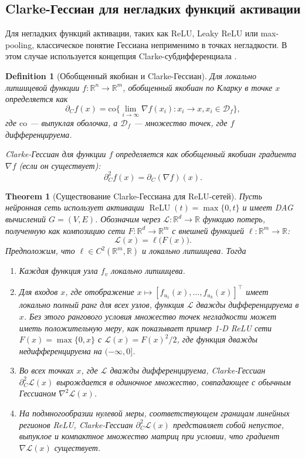 \documentclass[11pt]{article}
\newtheorem{theorem}{Theorem}
\newtheorem{definition}{Definition}
\begin{document}
\subsection{Clarke-Гессиан для негладких функций активации}

Для негладких функций активации, таких как ReLU, Leaky ReLU или max-pooling, классическое понятие Гессиана
неприменимо в точках негладкости. В этом случае используется концепция Clarke-субдифференциала
\citep{clarke1990optimization}.

\begin{definition}[Обобщенный якобиан и Clarke-Гессиан]
  Для локально липшицевой функции $f: \mathbb{R}^n \to \mathbb{R}^m$, обобщенный якобиан по Кларку в точке
  $x$ определяется как
  \[
    \partial_C f(x) = \mathrm{co}\{\lim_{i\to\infty} \nabla f(x_i) : x_i \to x, x_i \in \mathcal{D}_f\},
  \]
  где $\mathrm{co}$ — выпуклая оболочка, а $\mathcal{D}_f$ — множество точек, где $f$ дифференцируема.

  Clarke-Гессиан для функции $f$ определяется как обобщенный якобиан градиента $\nabla f$ (если он существует):
  \[
    \partial_C^2 f(x) = \partial_C(\nabla f)(x).
  \]
\end{definition}

\begin{theorem}[Существование Clarke-Гессиана для ReLU-сетей]
  \label{thm:clarke_hessian_relu}
  Пусть нейронная сеть использует активации $\operatorname{ReLU}(t)=\max\{0,t\}$
  и имеет DAG вычислений $G=(V,E)$.
  Обозначим через $\mathcal L:\mathbb R^{d}\to\mathbb R$ функцию потерь,
  полученную как композицию сети $F:\mathbb R^{d}\to\mathbb R^{m}$ с вне­шней
  функцией $\ell:\mathbb R^{m}\to\mathbb R$:
  \[
    \mathcal L(x)=\ell\bigl(F(x)\bigr).
  \]
  Предположим, что $\ell \in C^2(\mathbb{R}^m, \mathbb{R})$ и локально липшицева. Тогда

  \begin{enumerate}
    \item Каждая функция узла $f_v$ локально липшицева.
    \item Для входов $x$, где отображение $x \mapsto [f_{u_1}(x),\dots,f_{u_k}(x)]^{\!\top}$ имеет локально
      полный ранг для всех узлов, функция $\mathcal L$ дважды дифференцируема в $x$. Без этого рангового
      условия множество точек негладкости может иметь положительную меру, как показывает пример
      1-D ReLU сети $F(x)=\max\{0,x\}$ с $\mathcal L(x)=F(x)^2/2$, где функция дважды недифференцируема
      на $(-\infty,0]$.
    \item Во всех точках $x$, где $\mathcal L$ дважды дифференцируема,
      Clarke-Гессиан $\partial^2_C\mathcal L(x)$ вырождается в одиночное множество,
      совпадающее с обычным Гессианом $\nabla^{2}\mathcal L(x)$.
    \item На подмногообразии нулевой меры, соответствующем границам линейных регионов ReLU,
      Clarke-Гессиан $\partial^2_C\mathcal L(x)$ представляет собой
      непустое, выпуклое и компактное множество матриц при условии, что градиент $\nabla \mathcal L(x)$ существует.
  \end{enumerate}
\end{theorem}
\end{document}
